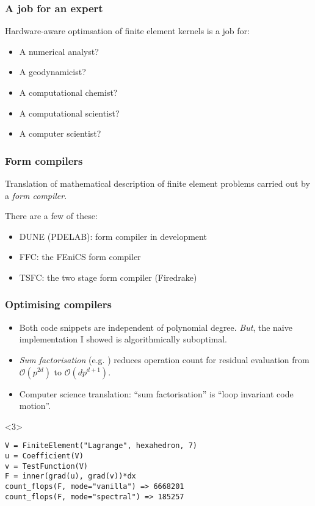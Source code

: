 \documentclass[presentation]{beamer}
\begin{document}
\begin{frame}
  \frametitle{A job for an expert}
  Hardware-aware optimsation of finite element kernels is a job for:
  \begin{itemize}
  \item A numerical analyst?
  \item A geodynamicist?
  \item A computational chemist?
  \item A computational scientist?
  \item A computer scientist?
  \end{itemize}
\end{frame}

\begin{frame}
  \frametitle{Form compilers}
  Translation of mathematical description of finite element problems
  carried out by a \emph{form compiler}.

  There are a few of these:

  \begin{itemize}
  \item DUNE (PDELAB): form compiler in development
  \item FFC: the FEniCS form compiler
  \item TSFC: the two stage form compiler (Firedrake)
  \end{itemize}  
\end{frame}

\begin{frame}[fragile]
  \frametitle{Optimising compilers}
  \begin{itemize}
  \item Both code snippets are independent of polynomial degree.
    \emph{But}, the naive implementation I showed is algorithmically
    suboptimal.

    \item \emph{Sum factorisation} (e.g. \textcite{Karniadakis:2005}) reduces
      operation count for residual evaluation from $\mathcal{O}(p^{2d})$
      to $\mathcal{O}(d p^{d+1})$.
    \item<2-> Computer science translation: ``sum factorisation'' is
      ``loop invariant code motion''.
  \end{itemize}
  \begin{uncoverenv}<3>
    \begin{center}
\begin{verbatim}
V = FiniteElement("Lagrange", hexahedron, 7)
u = Coefficient(V)
v = TestFunction(V)
F = inner(grad(u), grad(v))*dx
count_flops(F, mode="vanilla") => 6668201
count_flops(F, mode="spectral") => 185257
\end{verbatim}
    \end{center}
  \end{uncoverenv}
\end{frame}
\end{document}

